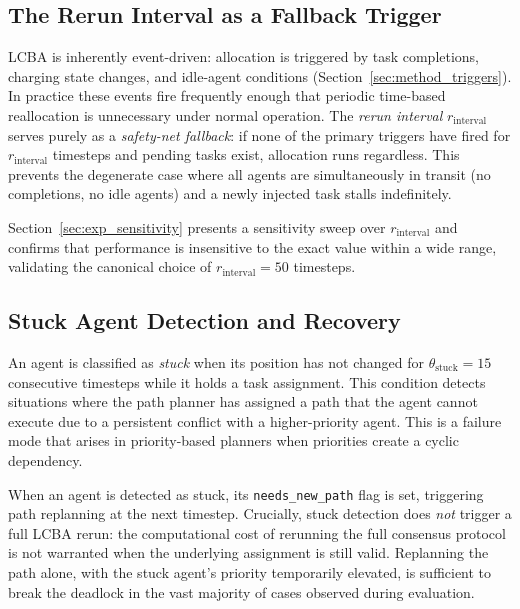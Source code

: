 \subsection{The Rerun Interval as a Fallback Trigger}
\label{subsec:method_rerun_interval}

LCBA is inherently event-driven: allocation is triggered by task completions,
charging state changes, and idle-agent conditions
(Section~\ref{sec:method_triggers}).
In practice these events fire frequently enough that periodic time-based
reallocation is unnecessary under normal operation.
The \emph{rerun interval} $r_{\text{interval}}$ serves purely as a
\emph{safety-net fallback}: if none of the primary triggers have fired for
$r_{\text{interval}}$ timesteps and pending tasks exist, allocation runs
regardless.
This prevents the degenerate case where all agents are simultaneously in
transit (no completions, no idle agents) and a newly injected task stalls
indefinitely.

Section~\ref{sec:exp_sensitivity} presents a sensitivity sweep over
$r_{\text{interval}}$ and confirms that performance is insensitive to the
exact value within a wide range, validating the canonical choice of
$r_{\text{interval}} = 50$ timesteps.


\subsection{Stuck Agent Detection and Recovery}
\label{subsec:method_stuck}

An agent is classified as \emph{stuck} when its position has not changed for
$\theta_{\text{stuck}} = 15$ consecutive timesteps while it holds a task
assignment.
This condition detects situations where the path planner has assigned a path
that the agent cannot execute due to a persistent conflict with a
higher-priority agent. This is a failure mode that arises in priority-based planners
when priorities create a cyclic dependency.

When an agent is detected as stuck, its \texttt{needs\_new\_path} flag is set,
triggering path replanning at the next timestep.
Crucially, stuck detection does \emph{not} trigger a full LCBA rerun: the
computational cost of rerunning the full consensus protocol is not warranted
when the underlying assignment is still valid.
Replanning the path alone, with the stuck agent's priority temporarily elevated,
is sufficient to break the deadlock in the vast majority of cases observed
during evaluation.


